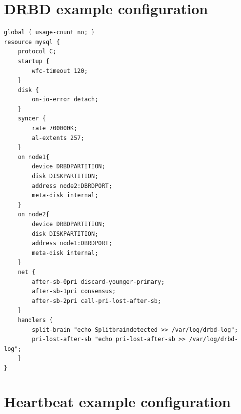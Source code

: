 \documentclass[a4paper,10pt]{report}
\begin{document}
\chapter{DRBD example configuration}
\label{drbdexample}
\begin{lstlisting}
global { usage-count no; }
resource mysql {
	protocol C;
	startup {
		wfc-timeout 120;
	}
	disk {
		on-io-error detach;
	}
	syncer {
		rate 700000K;
		al-extents 257;
	}
	on node1{
		device DRBDPARTITION;
		disk DISKPARTITION;
		address node2:DBRDPORT;
		meta-disk internal;
	}
	on node2{
		device DRBDPARTITION;
		disk DISKPARTITION;
		address node1:DBRDPORT;
		meta-disk internal;
	}
	net {
		after-sb-0pri discard-younger-primary;
		after-sb-1pri consensus;
 		after-sb-2pri call-pri-lost-after-sb;
	}
	handlers {
		split-brain "echo Splitbraindetected >> /var/log/drbd-log";
		pri-lost-after-sb "echo pri-lost-after-sb >> /var/log/drbd-log";
	}
}
\end{lstlisting}





\chapter{Heartbeat example configuration}
\label{cibexample}
\end{document}

